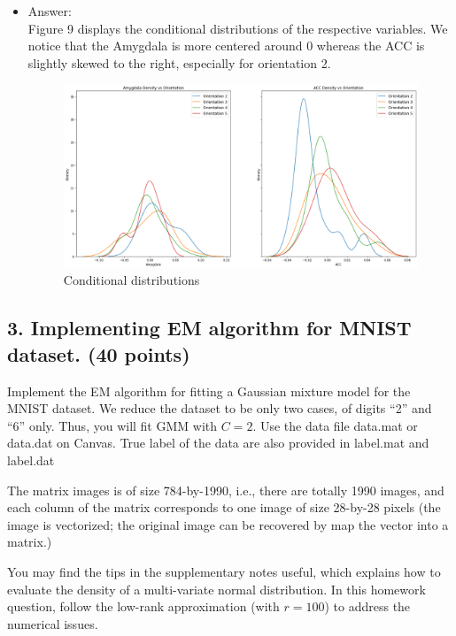 \documentclass[twoside,10pt]{article}
\begin{document}
 \begin{itemize}
\item Answer:\\
Figure 9 displays the conditional distributions of the respective variables. We notice that the Amygdala is more centered around 0 whereas the ACC is slightly skewed to the right, especially for orientation 2.
\begin{figure}[h!]
\begin{center}
\includegraphics[totalheight=3in]{Images/Q2c.png}
\end{center}
\caption{Conditional distributions}
\end{figure}

\end{itemize} 


\clearpage

\subsection*{3. Implementing EM algorithm for MNIST dataset. (40 points)}

 Implement the EM algorithm for fitting a Gaussian mixture model for the MNIST dataset. We reduce the dataset to be only two cases, of digits ``2'' and ``6'' only. Thus, you will fit GMM with $C = 2$. Use the data file \textsf{data.mat} or \textsf{data.dat} on Canvas. True label of the data are also provided in \textsf{label.mat} and \textsf{label.dat}


The matrix \textsf{images} is of size 784-by-1990, i.e., there are totally 1990 images, and each column of the matrix corresponds to one image of size 28-by-28 pixels (the image is vectorized; the original image can be recovered by map the vector into a matrix.) 

You may find the tips in the supplementary notes useful, which explains how to evaluate the density of a multi-variate normal distribution. In this homework question, follow the low-rank approximation (with $r = 100$) to address the numerical issues.
\end{document}
